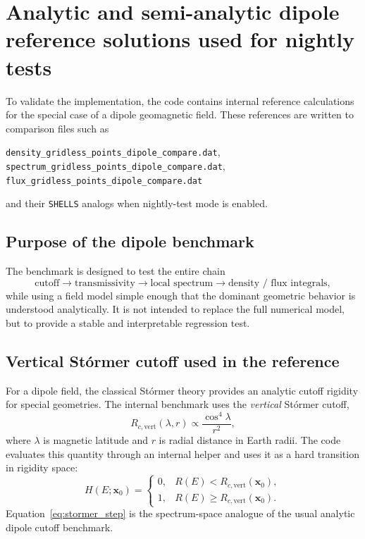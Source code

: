 \documentclass[11pt]{article}
\begin{document}
\section{Analytic and semi-analytic dipole reference solutions used for nightly tests}
To validate the implementation, the code contains internal reference calculations
for the special case of a dipole geomagnetic field. These references are written
to comparison files such as
\begin{center}
\texttt{density\_gridless\_points\_dipole\_compare.dat},\quad
\texttt{spectrum\_gridless\_points\_dipole\_compare.dat},\quad
\texttt{flux\_gridless\_points\_dipole\_compare.dat}
\end{center}
and their \texttt{SHELLS} analogs when nightly-test mode is enabled.

\subsection{Purpose of the dipole benchmark}
The benchmark is designed to test the entire chain
\begin{equation}
  \text{cutoff} \rightarrow \text{transmissivity} \rightarrow \text{local spectrum}
  \rightarrow \text{density / flux integrals},
\end{equation}
while using a field model simple enough that the dominant geometric behavior is
understood analytically. It is not intended to replace the full numerical model,
but to provide a stable and interpretable regression test.

\subsection{Vertical St\'ormer cutoff used in the reference}
For a dipole field, the classical St\'ormer theory provides an analytic cutoff
rigidity for special geometries. The internal benchmark uses the \emph{vertical}
St\'ormer cutoff,
\begin{equation}
  R_{c,\mathrm{vert}}(\lambda,r)
  \propto \frac{\cos^4\lambda}{r^2},
\end{equation}
where $\lambda$ is magnetic latitude and $r$ is radial distance in Earth radii.
The code evaluates this quantity through an internal helper and uses it as a
hard transition in rigidity space:
\begin{equation}
  H(E;\bm{x}_0)=
  \begin{cases}
    0, & R(E) < R_{c,\mathrm{vert}}(\bm{x}_0),\\
    1, & R(E) \ge R_{c,\mathrm{vert}}(\bm{x}_0).
  \end{cases}
  \label{eq:stormer_step}
\end{equation}
Equation~\eqref{eq:stormer_step} is the spectrum-space analogue of the usual
analytic dipole cutoff benchmark.
\end{document}
